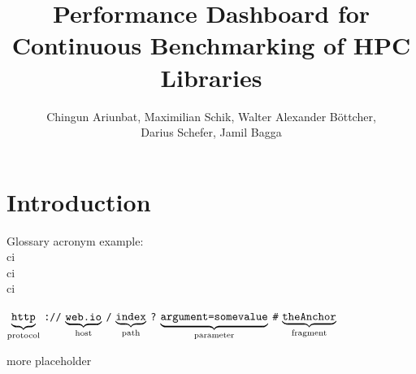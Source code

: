 \documentclass[parskip=full,11pt]{scrartcl}
\title{Performance Dashboard for Continuous Benchmarking of HPC Libraries}
\author{Chingun Ariunbat, Maximilian Schik, Walter Alexander B\"ottcher,\\ Darius Schefer, Jamil Bagga}
\newcommand\urlpart[2]{$\underbrace{\text{\texttt{#1}}}_{\text{#2}}$}
\begin{document}
\maketitle

\section{Introduction}
Glossary acronym example: \\
\acrshort{ci} \\
\acrlong{ci} \\
\acrfull{ci}

\begin{center}
\urlpart{http}{protocol}%
\texttt{://}%
\urlpart{web.io}{host}%
\texttt{/}%
\urlpart{index}{path}%
\texttt{?}%
\urlpart{argument=somevalue}{parameter}%
\texttt{\#}%
\urlpart{theAnchor}{fragment}
\end{center}

more placeholder


\clearpage


\clearpage


\clearpage


\clearpage

\appendix


\printnoidxglossaries
\end{document}
